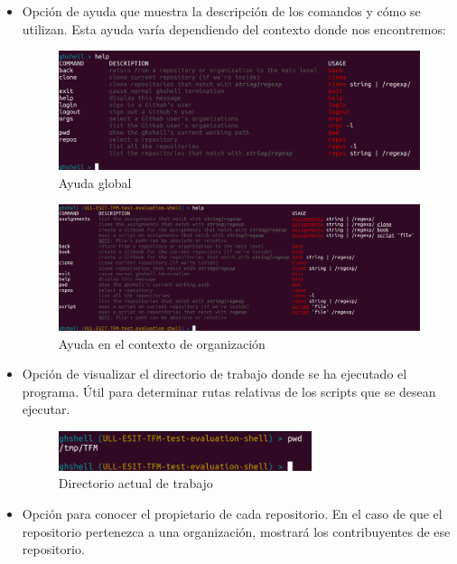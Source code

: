 \begin{itemize}
	\item Opción de ayuda que muestra la descripción de los comandos y cómo se utilizan. Esta ayuda varía dependiendo del contexto donde nos encontremos:
	
		\begin{figure}[H]
		\begin{center}
		\includegraphics[width=1\textwidth]{images/help1-1}
		\caption{Ayuda global}
		\label{fig:help1-1}
		\end{center}
		\end{figure}
		
		\begin{figure}[H]
		\begin{center}
		\includegraphics[width=1\textwidth]{images/help1-2}
		\caption{Ayuda en el contexto de organización}
		\label{fig:help1-2}
		\end{center}
		\end{figure}
	
	\item Opción de visualizar el directorio de trabajo donde se ha ejecutado el programa. Útil para determinar rutas relativas de los scripts que se desean ejecutar.
	
		\begin{figure}[H]
		\begin{center}
		\includegraphics[width=0.7\textwidth]{images/pwd}
		\caption{Directorio actual de trabajo}
		\label{fig:pwd}
		\end{center}
		\end{figure}
	
	
	\item Opción para conocer el propietario de cada repositorio. En el caso de que el repositorio pertenezca a una organización, mostrará los contribuyentes de ese repositorio.
\end{itemize}

